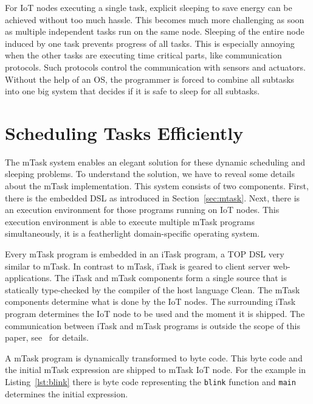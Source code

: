 \documentclass[runningheads]{llncs}
\newcommand{\CleanInline}[1]{\lstinline[language=Clean]!#1!}
\newcommand{\prog}[1]{\CleanInline{#1}}
\begin{document}
For IoT nodes executing a single task, explicit sleeping to save energy can be achieved without too much hassle.
This becomes much more challenging as soon as multiple independent tasks run on the same node.
Sleeping of the entire node induced by one task prevents progress of all tasks.
This is especially annoying when the other tasks are executing time critical parts, like communication protocols.
Such protocols control the communication with sensors and actuators.
Without the help of an OS, the programmer is forced to combine all subtasks into one big system that decides if it is safe to sleep for all subtasks.

\section{Scheduling Tasks Efficiently}%
\label{sec:SchedulingTasksEfficiently}

The mTask system enables an elegant solution for these dynamic scheduling and sleeping problems.
To understand the solution, we have to reveal some details about the mTask implementation.
This system consists of two components.
First, there is the embedded DSL as introduced in Section~\ref{sec:mtask}.
Next, there is an execution environment for those programs running on IoT nodes.
This execution environment is able to execute multiple mTask programs simultaneously, it is a featherlight domain-specific operating system.


Every mTask program is embedded in an iTask program, a TOP DSL very similar to mTask.
In contrast to mTask, iTask is geared to client server web-applications.
The iTask and mTask components form a single source that is statically type-checked by the compiler of the host language Clean.
The mTask components determine what is done by the IoT nodes.
The surrounding iTask program determines the IoT node to be used and the moment it is shipped.
The communication between iTask and mTask programs is outside the scope of this paper, see~\cite{lubbers_writing_2019} for details.

A mTask program is dynamically transformed to byte code.
This byte code and the initial mTask expression are shipped to mTask IoT node.
For the example in Listing~\ref{lst:blink} there is byte code representing the \prog{blink} function and \prog{main} determines the initial expression.
\end{document}
